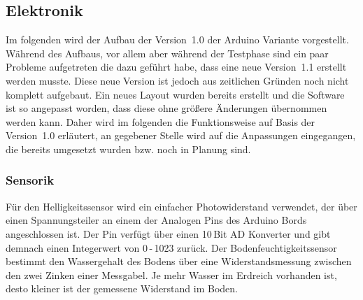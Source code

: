 \subsection{Elektronik}
Im folgenden wird der Aufbau der Version~1.0 der Arduino Variante vorgestellt. 
Während des Aufbaus, vor allem aber während der Testphase sind ein paar Probleme aufgetreten die dazu geführt habe, dass eine neue Version~1.1 erstellt werden musste. 
Diese neue Version ist jedoch aus zeitlichen Gründen noch nicht komplett aufgebaut. 
Ein neues Layout wurden bereits erstellt und die Software ist so angepasst worden, dass diese ohne größere Änderungen übernommen werden kann. 
Daher wird im folgenden die Funktionsweise auf Basis der Version~1.0 erläutert, an gegebener Stelle wird auf die Anpassungen eingegangen, die bereits umgesetzt wurden bzw. noch in Planung sind. 

			
\subsubsection{Sensorik} \label{sensorik}
Für den Helligkeitssensor wird ein einfacher Photowiderstand verwendet, der über einen Spannungsteiler an einem der Analogen Pins des Arduino Bords angeschlossen ist. Der Pin verfügt über einen 10\,Bit AD Konverter und gibt demnach einen Integerwert von 
0\,-\,1023 zurück.
Der Bodenfeuchtigkeitssensor bestimmt den Wassergehalt des Bodens über eine Widerstandsmessung zwischen den zwei Zinken einer Messgabel. 
Je mehr Wasser im Erdreich vorhanden ist, desto kleiner ist der gemessene Widerstand im Boden.

